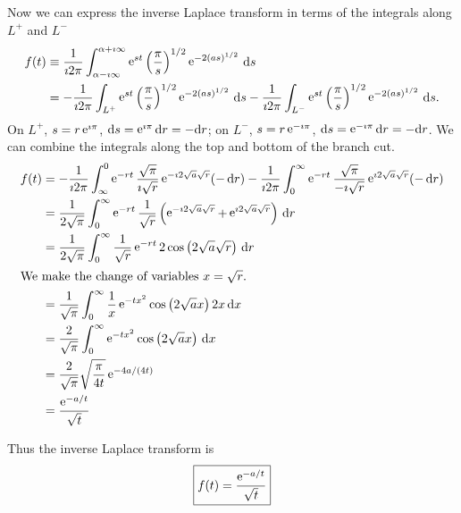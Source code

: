 {\begin{Solution}
  Now we can express the inverse Laplace transform in terms of the integrals
  along $L^+$ and $L^-$
  \begin{align*}
    f(t) &\equiv \frac{1}{\imath 2 \pi} \int_{\alpha - \imath \infty}^{\alpha + \imath \infty}
    \mathop{\mathrm{e}}\nolimits^{s t} \left( \frac{\pi}{s} \right)^{1/2} \mathop{\mathrm{e}}\nolimits^{-2 (a s)^{1/2}} \,\mathrm{d} s\\
    &= - \frac{1}{\imath 2 \pi}\int_{L^+} 
    \mathop{\mathrm{e}}\nolimits^{s t} \left( \frac{\pi}{s} \right)^{1/2} \mathop{\mathrm{e}}\nolimits^{-2 (a s)^{1/2}} \,\mathrm{d} s
    - \frac{1}{\imath 2 \pi}\int_{L^-} 
    \mathop{\mathrm{e}}\nolimits^{s t} \left( \frac{\pi}{s} \right)^{1/2} \mathop{\mathrm{e}}\nolimits^{-2 (a s)^{1/2}} \,\mathrm{d} s.
  \end{align*}
  On $L^+$, $s = r \mathop{\mathrm{e}}\nolimits^{\imath \pi}$, $\mathrm{d} s = \mathop{\mathrm{e}}\nolimits^{\imath \pi} \mathrm{d} r = - \mathrm{d} r$;
  on $L^-$, $s = r \mathop{\mathrm{e}}\nolimits^{-\imath \pi}$, $\mathrm{d} s = \mathop{\mathrm{e}}\nolimits^{-\imath \pi} \mathrm{d} r = - \mathrm{d} r$.
  We can combine the integrals along the top and bottom of the branch cut.
  \begin{align*}
    f(t)
    &= - \frac{1}{\imath 2 \pi}\int_{\infty}^0
    \mathop{\mathrm{e}}\nolimits^{-r t} \frac{\sqrt{\pi}}{\imath \sqrt{r}} \mathop{\mathrm{e}}\nolimits^{- \imath 2 \sqrt{a} \sqrt{r}} (-\,\mathrm{d} r)
    - \frac{1}{\imath 2 \pi}\int_{0}^{\infty} \mathop{\mathrm{e}}\nolimits^{-r t} \frac{\sqrt{\pi}}{-\imath \sqrt{r}} 
    \mathop{\mathrm{e}}\nolimits^{\imath 2 \sqrt{a} \sqrt{r}} (-\,\mathrm{d} r) \\
    &= \frac{1}{2 \sqrt{\pi}} \int_0^\infty \mathop{\mathrm{e}}\nolimits^{-r t} \frac{1}{\sqrt{r}} 
    \left( \mathop{\mathrm{e}}\nolimits^{- \imath 2 \sqrt{a} \sqrt{r}} + \mathop{\mathrm{e}}\nolimits^{\imath 2 \sqrt{a} \sqrt{r}} \right) \,\mathrm{d} r \\
    &= \frac{1}{2 \sqrt{\pi}} \int_0^\infty \frac{1}{\sqrt{r}} \mathop{\mathrm{e}}\nolimits^{-r t}
    2 \cos \left( 2 \sqrt{a} \sqrt{r} \right) \,\mathrm{d} r \\
    \intertext{We make the change of variables $x = \sqrt{r}$.}
    &= \frac{1}{\sqrt{\pi}} \int_0^\infty \frac{1}{x} \mathop{\mathrm{e}}\nolimits^{-t x^2}
    \cos \left( 2 \sqrt{a} x \right) 2 x\,\mathrm{d} x \\
    &= \frac{2}{\sqrt{\pi}} \int_0^\infty \mathop{\mathrm{e}}\nolimits^{-t x^2}
    \cos \left( 2 \sqrt{a} x \right) \,\mathrm{d} x \\
    &= \frac{2}{\sqrt{\pi}} \sqrt{ \frac{ \pi }{ 4 t } }
    \mathop{\mathrm{e}}\nolimits^{- 4 a / (4 t)} \\
    &= \frac{ \mathop{\mathrm{e}}\nolimits^{-a / t} }{ \sqrt{t} }
  \end{align*}

  Thus the inverse Laplace transform is 
  \[
  \boxed{
    f(t) = \frac{ \mathop{\mathrm{e}}\nolimits^{-a / t} }{ \sqrt{t} }
    }
  \]
\end{Solution}







}
